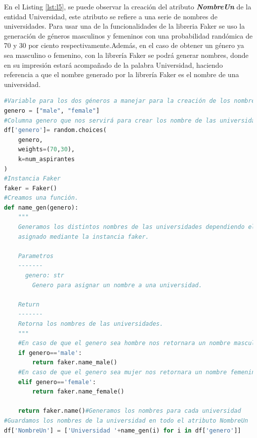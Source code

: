 \documentclass[10pt, oneside,spanish]{article}   	%
\begin{document}
En el Listing \ref{lst:l5}, se puede observar la creación del atributo \textbf{\textit{NombreUn}} de la entidad Universidad, este atributo se refiere a una serie de nombres de universidades. Para usar una de la funcionalidades de la libreria Faker se uso la generación de géneros masculinos y femeninos con una probabilidad randómica de 70 y 30 por ciento respectivamente.Además, en el caso de obtener un género ya sea masculino o femenino, con la librería Faker se podrá generar nombres, donde en su impresión estará acompañado de la palabra Universidad, haciendo referencia a que el nombre generado por la librería Faker es el nombre de una universidad.
\begin{lstlisting}[language=Python,label={lst:l5},caption=Atributo NombreUn de la entidad Universidad,frame=single, ]
#Variable para los dos géneros a manejar para la creación de los nombre de las universidades.
genero = ["male", "female"]
#Columna genero que nos servirá para crear los nombre de las universidades.
df['genero']= random.choices(
    genero, 
    weights=(70,30), 
    k=num_aspirantes
)
#Instancia Faker
faker = Faker()
#Creamos una función.
def name_gen(genero):
    """
    Generamos los distintos nombres de las universidades dependiendo el genero 
    asignado mediante la instancia faker.

    Parametros
    -------
      genero: str
        Genero para asignar un nombre a una universidad.
    
    Return
    -------
    Retorna los nombres de las universidades.
    """
    #En caso de que el genero sea hombre nos retornara un nombre masculino
    if genero=='male':
        return faker.name_male()
    #En caso de que el genero sea mujer nos retornara un nombre femenino
    elif genero=='female':
        return faker.name_female()
    
    return faker.name()#Generamos los nombres para cada universidad
#Guardamos los nombres de la universidad en todo el atributo NombreUn
df['NombreUn'] = ['Universidad '+name_gen(i) for i in df['genero']]
\end{lstlisting}
\end{document}
